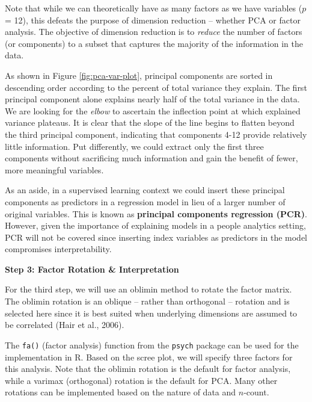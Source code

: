 \documentclass[
]{book}
\newenvironment{Shaded}{\begin{snugshade}}{\end{snugshade}}
\newcommand{\AttributeTok}[1]{\textcolor[rgb]{0.77,0.63,0.00}{#1}}
\newcommand{\CommentTok}[1]{\textcolor[rgb]{0.56,0.35,0.01}{\textit{#1}}}
\newcommand{\DecValTok}[1]{\textcolor[rgb]{0.00,0.00,0.81}{#1}}
\newcommand{\FunctionTok}[1]{\textcolor[rgb]{0.00,0.00,0.00}{#1}}
\newcommand{\NormalTok}[1]{#1}
\newcommand{\OtherTok}[1]{\textcolor[rgb]{0.56,0.35,0.01}{#1}}
\newcommand{\SpecialCharTok}[1]{\textcolor[rgb]{0.00,0.00,0.00}{#1}}
\newcommand{\StringTok}[1]{\textcolor[rgb]{0.31,0.60,0.02}{#1}}
\begin{document}
Note that while we can theoretically have as many factors as we have variables (\(p\) = 12), this defeats the purpose of dimension reduction -- whether PCA or factor analysis. The objective of dimension reduction is to \emph{reduce} the number of factors (or components) to a subset that captures the majority of the information in the data.

As shown in Figure \ref{fig:pca-var-plot}, principal components are sorted in descending order according to the percent of total variance they explain. The first principal component alone explains nearly half of the total variance in the data. We are looking for the \emph{elbow} to ascertain the inflection point at which explained variance plateaus. It is clear that the slope of the line begins to flatten beyond the third principal component, indicating that components 4-12 provide relatively little information. Put differently, we could extract only the first three components without sacrificing much information and gain the benefit of fewer, more meaningful variables.

As an aside, in a supervised learning context we could insert these principal components as predictors in a regression model in lieu of a larger number of original variables. This is known as \textbf{principal components regression (PCR)}. However, given the importance of explaining models in a people analytics setting, PCR will not be covered since inserting index variables as predictors in the model compromises interpretability.

\textbf{Step 3: Factor Rotation \& Interpretation}

For the third step, we will use an oblimin method to rotate the factor matrix. The oblimin rotation is an oblique -- rather than orthogonal -- rotation and is selected here since it is best suited when underlying dimensions are assumed to be correlated (Hair et al., 2006).

The \texttt{fa()} (factor analysis) function from the \texttt{psych} package can be used for the implementation in R. Based on the scree plot, we will specify three factors for this analysis. Note that the oblimin rotation is the default for factor analysis, while a varimax (orthogonal) rotation is the default for PCA. Many other rotations can be implemented based on the nature of data and \(n\)-count.

\begin{Shaded}
\end{Shaded}
\end{document}
